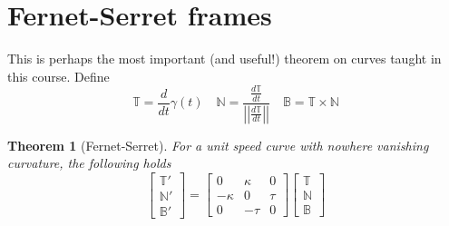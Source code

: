 \documentclass[oneside]{book}\twocolumn
\newtheorem{theorem}{Theorem}
\begin{document}
\section{Fernet-Serret frames}
This is perhaps the most important (and useful!) theorem on curves taught in this course. 
Define
$$\mathbb{T}=\frac{d}{dt}\gamma(t)\quad \mathbb{N}=\frac{\frac{d\mathbb T}{dt}}{\left|\left|\frac{d\mathbb T}{dt}\right|\right|}\quad\mathbb B=\mathbb T\times \mathbb N$$
\begin{theorem}[Fernet-Serret]
For a unit speed curve with nowhere vanishing curvature, the following holds
\begin{equation*}
	\begin{bmatrix}
		\mathbb{T}'\\\mathbb{N}'\\\mathbb{B}'
	\end{bmatrix}=
	\begin{bmatrix}
		0&\kappa&0\\
		-\kappa&0&\tau\\
		0&-\tau&0
	\end{bmatrix}
	\begin{bmatrix}
		\mathbb{T}\\\mathbb{N}\\\mathbb{B}
	\end{bmatrix}
\end{equation*}	
\end{theorem}
\end{document}

